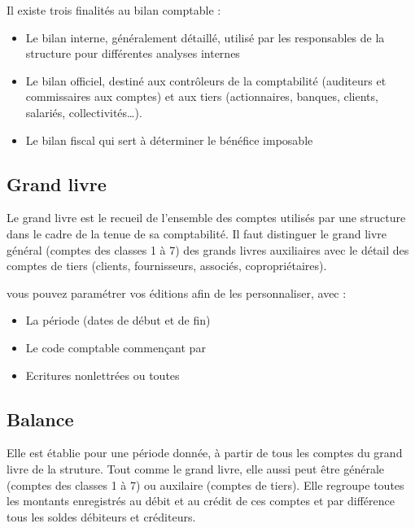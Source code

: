 \documentclass[a4paper,10pt,oneside,french]{sphinxmanual}
\begin{document}
Il existe trois finalités au bilan comptable :
\begin{itemize}
\item {} 
Le bilan interne, généralement détaillé, utilisé par les responsables de la structure pour différentes analyses internes

\item {} 
Le bilan officiel, destiné aux contrôleurs de la comptabilité (auditeurs et commissaires aux comptes) et aux tiers (actionnaires, banques, clients, salariés, collectivités…).

\item {} 
Le bilan fiscal qui sert à déterminer le bénéfice imposable

\end{itemize}


\subsection{Grand livre}
\label{\detokenize{accounting/reporting:grand-livre}}
Le grand livre est le recueil de l’ensemble des comptes utilisés par une structure dans le cadre de la tenue de sa comptabilité.
Il faut distinguer le grand livre général (comptes des classes 1 à 7) des grands livres auxiliaires avec le détail des comptes de tiers (clients, fournisseurs, associés, copropriétaires).

vous pouvez paramétrer vos éditions afin de les personnaliser, avec :
\begin{itemize}
\item {} 
La période (dates de début et de fin)

\item {} 
Le code comptable commençant par

\item {} 
Ecritures non\sphinxhyphen{}lettrées ou toutes

\end{itemize}


\subsection{Balance}
\label{\detokenize{accounting/reporting:balance}}
Elle est établie pour une période donnée, à partir de tous les comptes du grand livre de la struture. Tout comme le grand livre, elle aussi peut être générale (comptes des classes 1 à 7) ou auxilaire (comptes de tiers). Elle regroupe toutes les montants enregistrés au débit et au crédit de ces comptes et par différence tous les soldes débiteurs et créditeurs.
\end{document}
